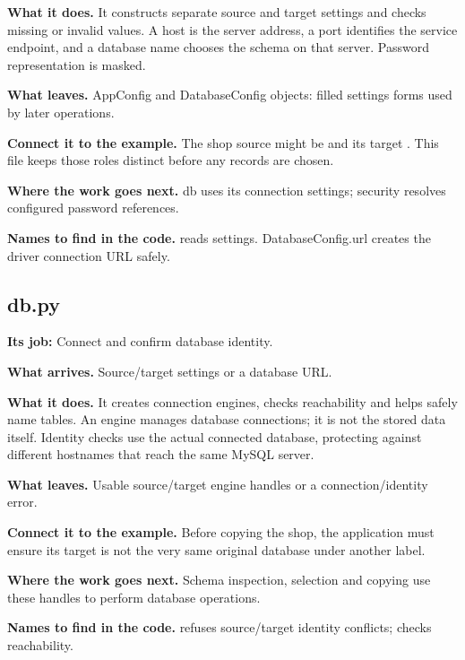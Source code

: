 \textbf{What it does.} It constructs separate source and target settings and checks missing or invalid values. A host is the server address, a port identifies the service endpoint, and a database name chooses the schema on that server. Password representation is masked.

\textbf{What leaves.} AppConfig and DatabaseConfig objects: filled settings forms used by later operations.

\textbf{Connect it to the example.} The shop source might be  and its target . This file keeps those roles distinct before any records are chosen.

\textbf{Where the work goes next.} db uses its connection settings; security resolves configured password references.

\textbf{Names to find in the code.}  reads settings. DatabaseConfig.url creates the driver connection URL safely.


\subsection{db.py}

\textbf{Its job:} Connect and confirm database identity.

\textbf{What arrives.} Source/target settings or a database URL.

\textbf{What it does.} It creates connection engines, checks reachability and helps safely name tables. An engine manages database connections; it is not the stored data itself. Identity checks use the actual connected database, protecting against different hostnames that reach the same MySQL server.

\textbf{What leaves.} Usable source/target engine handles or a connection/identity error.

\textbf{Connect it to the example.} Before copying the shop, the application must ensure its target is not the very same original database under another label.

\textbf{Where the work goes next.} Schema inspection, selection and copying use these handles to perform database operations.

\textbf{Names to find in the code.}  refuses source/target identity conflicts;  checks reachability.



